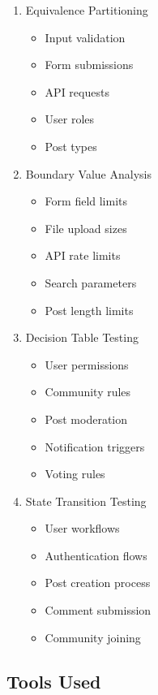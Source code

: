 \begin{enumerate}
    \item Equivalence Partitioning
    \begin{itemize}
        \item Input validation
        \item Form submissions
        \item API requests
        \item User roles
        \item Post types
    \end{itemize}
    
    \item Boundary Value Analysis
    \begin{itemize}
        \item Form field limits
        \item File upload sizes
        \item API rate limits
        \item Search parameters
        \item Post length limits
    \end{itemize}
    
    \item Decision Table Testing
    \begin{itemize}
        \item User permissions
        \item Community rules
        \item Post moderation
        \item Notification triggers
        \item Voting rules
    \end{itemize}
    
    \item State Transition Testing
    \begin{itemize}
        \item User workflows
        \item Authentication flows
        \item Post creation process
        \item Comment submission
        \item Community joining
    \end{itemize}
\end{enumerate}

\subsection{Tools Used}

